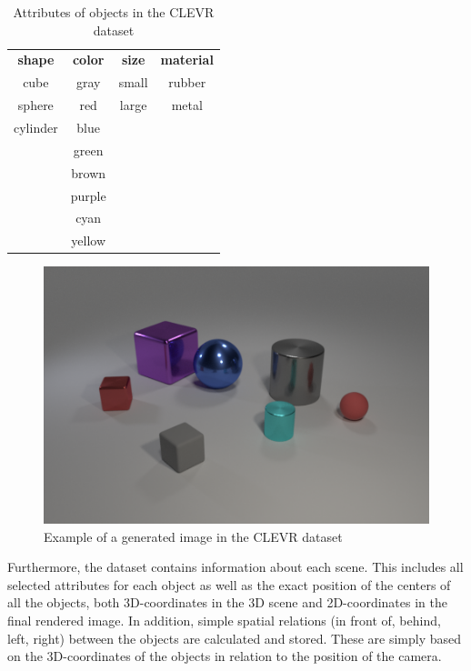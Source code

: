 \begin{table}[h]
    \centering
    \begin{tabular}{cccc}
        \toprule
        \textbf{ shape } & \textbf{ color } & \textbf{ size } & \textbf{ material } \\
        cube             & gray             & small           & rubber              \\
        sphere           & red              & large           & metal               \\
        cylinder         & blue                                                     \\
                         & green                                                    \\
                         & brown                                                    \\
                         & purple                                                   \\
                         & cyan                                                     \\
                         & yellow                                                   \\
        \bottomrule
    \end{tabular}
    \caption{Attributes of objects in the CLEVR dataset}
    \label{tab:clevr-attributes}
\end{table}

\begin{figure}[h]
    \centering
    \includegraphics[width=.8\linewidth]{figures/CLEVR_example.png}
    \caption{Example of a generated image in the CLEVR dataset}
    \label{fig:clevr-example}
\end{figure}

Furthermore, the dataset contains information about each scene.
This includes all selected attributes for each object as well as the exact position of the centers of all the objects, both 3D-coordinates in the 3D scene and 2D-coordinates in the final rendered image.
In addition, simple spatial relations (in front of, behind, left, right) between the objects are calculated and stored.
These are simply based on the 3D-coordinates of the objects in relation to the position of the camera.

